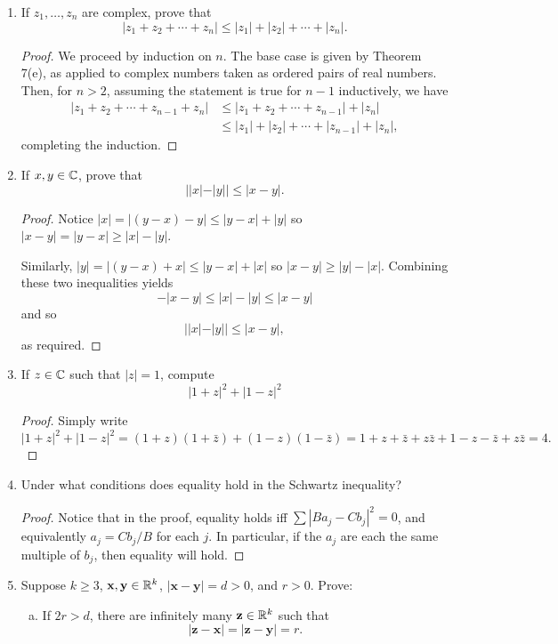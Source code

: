 \begin{enumerate}
\item If $z_1, \dotsc, z_n$ are complex, prove that
\[
	|z_1 + z_2 + \dotsb + z_n| \le |z_1| + |z_2| + \dotsb + |z_n|.
\]

\begin{proof}
We proceed by induction on $n$. The base case is given by Theorem 7(e), as applied to complex numbers taken as ordered pairs of real numbers. Then, for $n > 2$, assuming the statement is true for $n - 1$ inductively, we have
\begin{align*}
	|z_1 + z_2 + \dotsb + z_{n-1} + z_n| &\le |z_1 + z_2 + \dotsb + z_{n-1}| + |z_n| \\
		&\le |z_1| + |z_2| + \dotsb + |z_{n-1}| + |z_n|,
\end{align*}
completing the induction.
\end{proof}

\item If $x, y \in \mathbb{C}$, prove that 
\[
	||x| - |y|| \le |x - y|.
\]

\begin{proof}
Notice $|x| = |(y - x) - y| \le |y - x| + |y|$ so $|x - y| = |y - x| \ge |x| - |y|$. 

Similarly, $|y| = |(y - x) + x| \le |y - x| + |x|$ so $|x - y| \ge |y| - |x|$. Combining these two inequalities yields
\[
	-|x - y| \le |x| - |y| \le |x - y| 
\]
and so
\[
	||x| - |y|| \le |x - y|,
\]
as required.
\end{proof}

\item If $z \in \mathbb{C}$ such that $|z| = 1$, compute
\[
	|1 + z|^2 + |1 - z|^2
\]

\begin{proof}
Simply write
\[
	|1 + z|^2 + |1 - z|^2 = (1 + z)(1 + \bar{z}) + (1 - z)(1 - \bar{z}) = 1 + z + \bar{z} + z\bar{z} + 1 - z - \bar{z} + z\bar{z} = 4.
\]
\end{proof}

\item Under what conditions does equality hold in the Schwartz inequality?

\begin{proof}
Notice that in the proof, equality holds iff $\sum |Ba_j - Cb_j|^2 = 0$, and equivalently $a_j = Cb_j/B$ for each $j$. In particular, if the $a_j$ are each the same multiple of $b_j$, then equality will hold.
\end{proof}

\item Suppose $k \ge 3$, $\textbf{x}, \textbf{y} \in \mathbb{R}^k$, $|\textbf{x} - \textbf{y}| = d > 0$, and $r > 0$. Prove:
\begin{enumerate}[(a)]
\item If $2r > d$, there are infinitely many $\textbf{z} \in \mathbb{R}^k$ such that 
\[
	|\textbf{z} - \textbf{x}| = |\textbf{z} - \textbf{y}| = r.
\]


\end{enumerate}
\end{enumerate}
